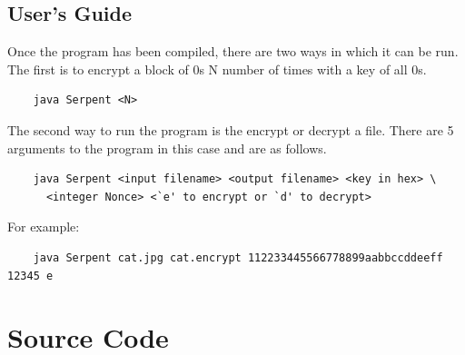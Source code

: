\documentclass[12pt]{article} %
\begin{document}
\subsection{User's Guide}
  Once the program has been compiled, there are two ways in which it can be run.  The first is to encrypt a block of 0s N number of times with a key of all 0s.
  \begin{verbatim}
  	java Serpent <N>
  \end{verbatim}
  The second way to run the program is the encrypt or decrypt a file.  There are 5 arguments to the program in this case and are as follows.
  \begin{verbatim}
  	java Serpent <input filename> <output filename> <key in hex> \
  	  <integer Nonce> <`e' to encrypt or `d' to decrypt>
  \end{verbatim}
  For example:
  \begin{verbatim}
  	java Serpent cat.jpg cat.encrypt 112233445566778899aabbccddeeff 12345 e
  \end{verbatim}

\section{Source Code}
\end{document}
